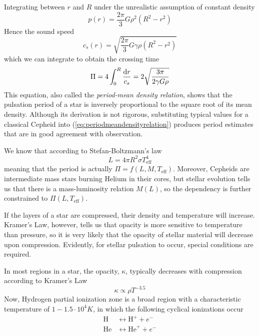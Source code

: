 Integrating between $r$ and $R$ under the unrealistic assumption of constant density 
\begin{equation*}
    p(r) = \frac{2\pi}{3}G\rho^{2}(R^{2}-r^{2})
\end{equation*}
Hence the sound speed 
\begin{equation}
    c_{s}(r) = \sqrt{\frac{2\pi}{3}G\gamma\rho(R^{2}-r^{2})}
    \label{eq:cepheidsroughsoundspeed}
\end{equation}
which we can integrate to obtain the crossing time 
\begin{equation}
    \Pi = 4\int_{0}^{R}\frac{\text{d}r}{c_{s}} = 2\sqrt{\frac{3\pi}{2\gamma G \rho}}
    \label{eq:periodmeandensityrelation}
\end{equation}
This equation, also called the \emph{period-mean density relation}, shows that the pulsation period of a star is inversely proportional to the square root of its mean density. Although its derivation is not rigorous, substituting typical values for a classical Cepheid into (\ref{eq:periodmeandensityrelation}) produces period estimates that are in good agreement with observation.
\par We know that according to Stefan-Boltzmann's law
\begin{equation*}
    L = 4\pi R^{2}\sigma T_{\text{eff}}^{4}
\end{equation*}
meaning that the period is actually $\Pi = f(L, M, T_{\text{eff}})$. Moreover, Cepheids are intermediate mass stars burning Helium in their cores, but stellar evolution tells us that there is a mass-luminosity relation $M(L)$, so the dependency is further constrained to $\Pi(L,T_{\text{eff}})$.
\par If the layers of a star are compressed, their density and temperature will increase. Kramer’s Law, however, tells us that opacity is more sensitive to temperature than pressure, so it is very likely that the opacity of stellar material will decrease upon compression. Evidently, for stellar pulsation to occur, special conditions are required.
\par In most regions in a star, the opacity, $\kappa$, typically decreases with compression according to Kramer’s Law
\begin{equation}
    \kappa \propto \rho T^{-3.5}
    \label{eq:kramerlaw}
\end{equation}
Now, Hydrogen partial ionization zone is a broad region with a characteristic temperature of $1-1.5\cdot 10^{4}\unit{K}$, in which the following cyclical ionizations occur
\begin{align*}
    \text{H} &\longleftrightarrow \text{H}^{+}+e^{-}\\
    \text{He} &\longleftrightarrow \text{He}^{+}+e^{-}
\end{align*}
